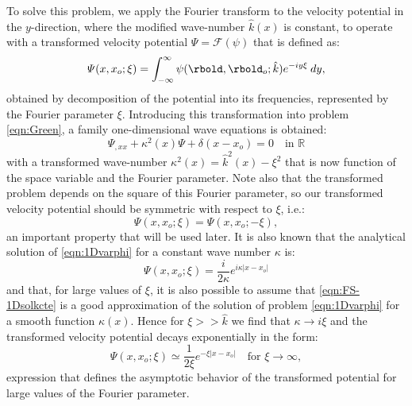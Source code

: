 To solve this problem, we apply the Fourier transform to the velocity potential in the $y$-direction, where the modified wave-number $\hat{k}(x)$ is constant, to operate with a transformed velocity potential $\varPsi=\mathcal{F}(\psi)$ that is defined as:
%
\begin{equation}
\label{eqn:FT-psi}
\varPsi (x,x_o;\xi) = \int_{-\infty}^{\infty} \psi(\rbold,\rbold_o; \hat{k}) e^{-i y \xi} \: dy,
\end{equation}
%
obtained by decomposition of the potential into its frequencies, represented by the Fourier parameter $\xi$. Introducing this transformation into problem \eqref{eqn:Green}, a family one-dimensional wave equations is obtained:
%
\begin{equation}
\label{eqn:1Dvarphi}
\varPsi_{,xx} + \kappa^{2}(x) \varPsi + \delta(x - x_o) = 0 \quad \text{in } \mathbb{R}
\end{equation}
%
with a transformed wave-number $\kappa^{2}(x)=\hat{k}^{2}(x)-\xi^{2}$ that is now function of the space variable and the Fourier parameter. Note also that the transformed problem depends on the square of this Fourier parameter, so our transformed velocity potential should be symmetric with respect to $\xi$, i.e.:
\begin{equation}
\label{eqn:symetry-xi}
\varPsi(x,x_o;\xi)=\varPsi(x,x_o;-\xi),
\end{equation}
an important property that will be used later. It is also known that the analytical solution of \eqref{eqn:1Dvarphi} for a constant wave number $\kappa$ is:
\begin{equation}
\label{eqn:FS-1Dsolkcte}
\varPsi(x,x_o;\xi) = \frac{i}{2 \kappa} e^{i \kappa |x-x_o|}
\end{equation}
and that, for large values of $\xi$, it is also possible to assume that \eqref{eqn:FS-1Dsolkcte} is a good approximation of the solution of problem \eqref{eqn:1Dvarphi} for a smooth function $\kappa(x)$. Hence for ${\xi} >> \hat{k}$ we find that $\kappa \rightarrow  i\xi$ and the transformed velocity potential decays exponentially in the form:
\begin{equation}
\label{eqn:FS-exponentially}
\varPsi(x,x_o;\xi) \simeq \frac{1}{2\xi}e^{-\xi |x- x_o|} \quad \text{for } {\xi} \rightarrow \infty,
\end{equation}
expression that defines the asymptotic behavior of the transformed potential for large values of the Fourier parameter.

